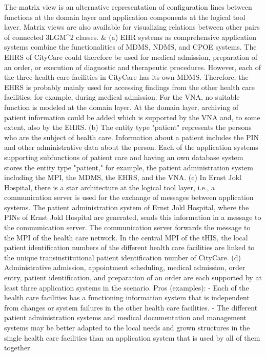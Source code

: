 The matrix view is an alternative representation of configuration lines between functions at the domain layer and application components at the logical tool layer. Matrix views are also available for visualizing relations between other pairs of connected 3LGM^2 classes. & (a) EHR systems as comprehensive application systems combine the functionalities of MDMS, NDMS, and CPOE systems. The EHRS of CityCare could therefore be used for medical admission, preparation of an order, or execution of diagnostic and therapeutic procedures. However, each of the three health care facilities in CityCare has its own MDMS. Therefore, the EHRS is probably mainly used for accessing findings from the other health care facilities, for example, during medical admission. For the VNA, no suitable function is modeled at the domain layer. At the domain layer, archiving of patient information could be added which is supported by the VNA and, to some extent, also by the EHRS.
(b) The entity type "patient" represents the persons who are the subject of health care. Information about a patient includes the PIN and other administrative data about the person. Each of the application systems supporting subfunctions of patient care and having an own database system stores the entity type "patient," for example, the patient administration system including the MPI, the MDMS, the EHRS, and the VNA.
(c) In Ernst Jokl Hospital, there is a star architecture at the logical tool layer, i.e., a communication server is used for the exchange of messages between application systems. The patient administration system of Ernst Jokl Hospital, where the PINs of Ernst Jokl Hospital are generated, sends this information in a message to the communication server. The communication server forwards the message to the MPI of the health care network. In the central MPI of the tHIS, the local patient identification numbers of the different health care facilities are linked to the unique transinstitutional patient identification number of CityCare.
(d) Administrative admission, appointment scheduling, medical admission, order entry, patient identification, and preparation of an order are each supported by at least three application systems in the scenario.
Pros (examples):
- Each of the health care facilities has a functioning information system that is independent from changes or system failures in the other health care facilities.
- The different patient administration systems and medical documentation and management systems may be better adapted to the local needs and grown structures in the single health care facilities than an application system that is used by all of them together.

